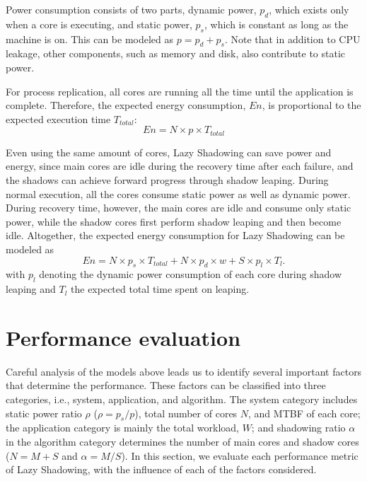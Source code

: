Power consumption consists of two parts, dynamic power, $p_d$, which exists only when a core is executing, and static power, $p_s$, which is constant as long as the machine is on. This can be modeled as $p = p_d + p_s$. Note that in addition to CPU leakage, other components, such as memory and disk, also contribute to static power. 


For process replication, all cores are running all the time until the application is complete. Therefore, the expected energy consumption, $En$, is proportional to the expected execution time $T_{total}$: 
\begin{equation}
En = N \times p \times T_{total}
\label{eq:exp_energy1}
\end{equation} 

Even using the same amount of cores, Lazy Shadowing can save power and energy, since main cores are idle during the recovery time after each failure, and the shadows can achieve forward progress through shadow leaping. During normal execution, all the cores consume static power as well as dynamic power. During recovery time, however, the main cores are idle and consume only static power, while the shadow cores first perform shadow leaping and then become idle. Altogether, the expected energy consumption for Lazy Shadowing can be modeled as 
\begin{equation}
En = N \times p_s \times T_{total} + N \times p_d \times w + S \times p_{l} \times T_l.
\label{eq:exp_energy2}
\end{equation}
with $p_{l}$ denoting the dynamic power consumption of each core during shadow leaping and $T_l$ the expected total time spent on leaping.

\section{Performance evaluation}

Careful analysis of the models above leads us to identify several important factors that determine the performance. These factors can be classified into three categories, i.e., system, application, and algorithm. The system category includes static power ratio $\rho$ ($\rho=p_s/p$), total number of cores $N$, and MTBF of each core; the application category is mainly the total workload, $W$; and shadowing ratio $\alpha$ in the algorithm category determines the number of main cores and shadow cores ($N=M+S$ and $\alpha=M/S$). In this section, we evaluate each performance metric of Lazy Shadowing, 
 with the influence of each of the factors considered.

